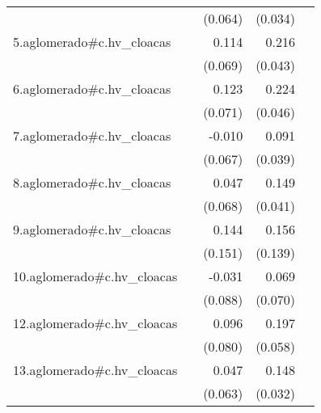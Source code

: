 {\begin{longtable}{l*{4}{D{.}{.}{-1}}}
            &                     &     (0.064)         &     (0.034)         &                     \\
\addlinespace
5.aglomerado#c.hv\_cloacas&                     &       0.114         &       0.216\sym{***}&                     \\
            &                     &     (0.069)         &     (0.043)         &                     \\
\addlinespace
6.aglomerado#c.hv\_cloacas&                     &       0.123         &       0.224\sym{***}&                     \\
            &                     &     (0.071)         &     (0.046)         &                     \\
\addlinespace
7.aglomerado#c.hv\_cloacas&                     &      -0.010         &       0.091\sym{*}  &                     \\
            &                     &     (0.067)         &     (0.039)         &                     \\
\addlinespace
8.aglomerado#c.hv\_cloacas&                     &       0.047         &       0.149\sym{***}&                     \\
            &                     &     (0.068)         &     (0.041)         &                     \\
\addlinespace
9.aglomerado#c.hv\_cloacas&                     &       0.144         &       0.156         &                     \\
            &                     &     (0.151)         &     (0.139)         &                     \\
\addlinespace
10.aglomerado#c.hv\_cloacas&                     &      -0.031         &       0.069         &                     \\
            &                     &     (0.088)         &     (0.070)         &                     \\
\addlinespace
12.aglomerado#c.hv\_cloacas&                     &       0.096         &       0.197\sym{***}&                     \\
            &                     &     (0.080)         &     (0.058)         &                     \\
\addlinespace
13.aglomerado#c.hv\_cloacas&                     &       0.047         &       0.148\sym{***}&                     \\
            &                     &     (0.063)         &     (0.032)         &                     \\

\end{longtable}}
